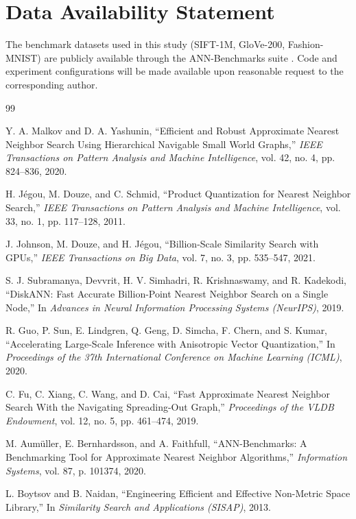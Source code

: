 \documentclass{ieeeaccess}
\begin{document}
\section*{Data Availability Statement}
The benchmark datasets used in this study (SIFT-1M, GloVe-200, Fashion-MNIST) are publicly available through the ANN-Benchmarks suite \cite{ANNBenchmarks2020, ANNBenchmarks2022, Aumuller2020_46}. Code and experiment configurations will be made available upon reasonable request to the corresponding author.


\begin{thebibliography}{99}

Y. A. Malkov and D. A. Yashunin,
``Efficient and Robust Approximate Nearest Neighbor Search Using Hierarchical Navigable Small World Graphs,''
\emph{IEEE Transactions on Pattern Analysis and Machine Intelligence},
vol. 42, no. 4, pp. 824--836, 2020.

H. J\'egou, M. Douze, and C. Schmid,
``Product Quantization for Nearest Neighbor Search,''
\emph{IEEE Transactions on Pattern Analysis and Machine Intelligence},
vol. 33, no. 1, pp. 117--128, 2011.

J. Johnson, M. Douze, and H. J\'egou,
``Billion-Scale Similarity Search with GPUs,''
\emph{IEEE Transactions on Big Data},
vol. 7, no. 3, pp. 535--547, 2021.

S. J. Subramanya, Devvrit, H. V. Simhadri, R. Krishnaswamy, and R. Kadekodi,
``DiskANN: Fast Accurate Billion-Point Nearest Neighbor Search on a Single Node,''
In \emph{Advances in Neural Information Processing Systems (NeurIPS)}, 2019.

R. Guo, P. Sun, E. Lindgren, Q. Geng, D. Simcha, F. Chern, and S. Kumar,
``Accelerating Large-Scale Inference with Anisotropic Vector Quantization,''
In \emph{Proceedings of the 37th International Conference on Machine Learning (ICML)}, 2020.

C. Fu, C. Xiang, C. Wang, and D. Cai,
``Fast Approximate Nearest Neighbor Search With the Navigating Spreading-Out Graph,''
\emph{Proceedings of the VLDB Endowment},
vol. 12, no. 5, pp. 461--474, 2019.

M. Aum\"uller, E. Bernhardsson, and A. Faithfull,
``ANN-Benchmarks: A Benchmarking Tool for Approximate Nearest Neighbor Algorithms,''
\emph{Information Systems},
vol. 87, p. 101374, 2020.

L. Boytsov and B. Naidan,
``Engineering Efficient and Effective Non-Metric Space Library,''
In \emph{Similarity Search and Applications (SISAP)}, 2013.


\end{thebibliography}
\end{document}
